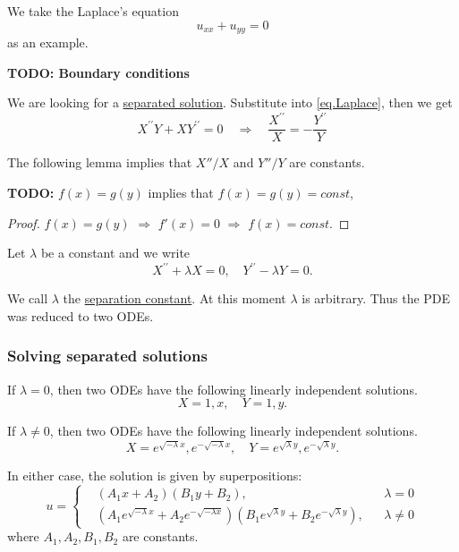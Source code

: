 We take the Laplace's equation
\begin{equation}\label{eq.Laplace}
    u_{x x}+u_{y y}=0
\end{equation}
as an example.

\textbf{TODO: Boundary conditions}

We are looking for a \underline{separated solution}. Substitute into \eqref{eq.Laplace}, then we get 
\begin{equation*}
    X^{\prime \prime} Y+X Y^{\prime \prime}=0 \quad\Rightarrow\quad
    \frac{X^{\prime \prime}}{X}= -\frac{Y^{\prime \prime}}{Y}
\end{equation*}

The following lemma implies that $X''/X$ and $Y''/Y$ are constants.

\begin{lemma}[]
    \textbf{TODO: } $f(x) = g(y)$ implies that $f(x) = g(y) = \textit{const}$,
\end{lemma}
\begin{proof}
    $f(x) = g(y)$ $\Rightarrow$ $f'(x) = 0$ $\Rightarrow$ $f(x) = \textit{const}$.
\end{proof}

Let $\lambda$ be a constant and we write
\begin{equation*}
    X^{\prime \prime}+\lambda X=0, \quad Y^{\prime \prime}-\lambda Y=0 .
\end{equation*}

We call $\lambda$ the \underline{separation constant}. At this moment $\lambda$ is arbitrary. Thus the PDE was reduced to two ODEs.

\subsubsection{Solving separated solutions}

If $\lambda=0$, then two ODEs have the following linearly independent solutions.
\begin{equation}\label{eq.separated_basis_0}
X=1, x, \quad Y=1, y.
\end{equation}

If $\lambda \neq 0$, then two ODEs have the following linearly independent solutions.
\begin{equation}\label{eq.separated_basis}
X=e^{\sqrt{-\lambda} x}, e^{-\sqrt{-\lambda} x}, \quad Y=e^{\sqrt{\lambda} y}, e^{-\sqrt{\lambda} y} .
\end{equation}

In either case, the solution is given by superpositions:
\begin{equation}\label{eq.basis_separated}
u=
\left\{\begin{aligned}
&\left(A_1 x+A_2\right)\left(B_1 y+B_2\right), && \lambda=0 
\\
&\left(A_1 e^{\sqrt{-\lambda} x}+A_2 e^{-\sqrt{-\lambda x}}\right)\left(B_1 e^{\sqrt{\lambda} y}+B_2 e^{-\sqrt{\lambda} y}\right), && \lambda \neq 0
\end{aligned}\right.
\end{equation}
where $A_1, A_2, B_1, B_2$ are constants. 

